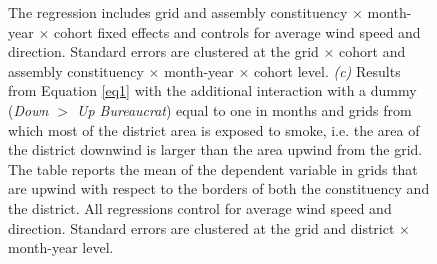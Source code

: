 \documentclass[12pt]{article}
\begin{document}
\begin{figure}
\begin{minipage}{\textwidth}
{         %
          The regression includes grid and assembly constituency $\times$ month-year $\times$ cohort fixed effects and controls for average wind speed and direction. Standard errors are clustered at the grid $\times$ cohort and assembly constituency $\times$ month-year $\times$ cohort level.
          \textit{(c)} Results from Equation \ref{eq1} with the additional interaction with a dummy (\textit{Down $>$ Up Bureaucrat}) equal to one in months and grids from which most of the district area is exposed to smoke, i.e. the area of the district downwind is larger than the area upwind from the grid.
      The table reports the mean of the dependent variable in grids that are upwind with respect to the borders of both the constituency and the district.   All regressions control for average wind speed and direction. Standard errors are clustered at the grid and district $\times$ month-year level. }
     \end{minipage}
\end{figure}
\end{document}
